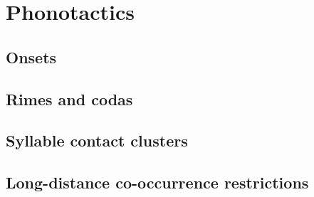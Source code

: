 \chapter{Phonotactics}
\label{phonotactics}

\citet{Sommerstein1974}


\section{Onsets}

\section{Rimes and codas}

\section{Syllable contact clusters}

    \citet{Haugen1956}

\section{Long-distance co-occurrence restrictions}

